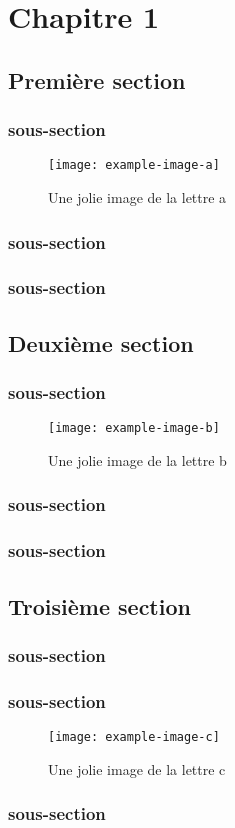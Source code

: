 \chapter{Chapitre 1}
\section{Première section}
\subsection{sous-section}
\lipsum[2]
\begin{figure}[!ht]
  \centering
      \texttt{[image: example-image-a]}
  \caption{Une jolie image de la lettre a}
\end{figure}
\lipsum[1]
\subsection{sous-section}
\lipsum[2]
\subsection{sous-section}
\lipsum[2]

\section{Deuxième section}
\subsection{sous-section}
\lipsum[2]

   
\begin{figure}[!ht]
      \texttt{[image: example-image-b]}
  \caption{Une jolie image de la lettre b}
\end{figure}

\lipsum[1]
\subsection{sous-section}
\lipsum[2]
\subsection{sous-section}
\lipsum[2]

\section{Troisième section}
\subsection{sous-section}
\lipsum[2]
\subsection{sous-section}
\lipsum[2]
\begin{figure}[!ht]
  \centering
      \texttt{[image: example-image-c]}
  \caption{Une jolie image de la lettre c}
\end{figure}
\lipsum[1]
\subsection{sous-section}
\lipsum[2]